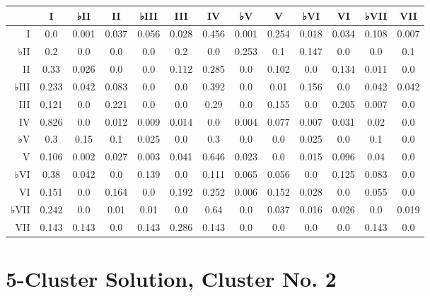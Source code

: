 \begin{table}[htbp]
\begin{minipage}{\linewidth}
\setlength{\tymax}{0.5\linewidth}
\centering
\small
\begin{tabulary}{\textwidth}{@{}RCCCCCCCCCCCC@{}} \toprule
&I&♭II&II&♭III&III&IV&♭V&V&♭VI&VI&♭VII&VII\\
\midrule
I&0.0&0.001&0.037&0.056&0.028&0.456&0.001&0.254&0.018&0.034&0.108&0.007\\
♭II&0.2&0.0&0.0&0.0&0.2&0.0&0.253&0.1&0.147&0.0&0.0&0.1\\
II&0.33&0.026&0.0&0.0&0.112&0.285&0.0&0.102&0.0&0.134&0.011&0.0\\
♭III&0.233&0.042&0.083&0.0&0.0&0.392&0.0&0.01&0.156&0.0&0.042&0.042\\
III&0.121&0.0&0.221&0.0&0.0&0.29&0.0&0.155&0.0&0.205&0.007&0.0\\
IV&0.826&0.0&0.012&0.009&0.014&0.0&0.004&0.077&0.007&0.031&0.02&0.0\\
♭V&0.3&0.15&0.1&0.025&0.0&0.3&0.0&0.0&0.025&0.0&0.1&0.0\\
V&0.106&0.002&0.027&0.003&0.041&0.646&0.023&0.0&0.015&0.096&0.04&0.0\\
♭VI&0.38&0.042&0.0&0.139&0.0&0.111&0.065&0.056&0.0&0.125&0.083&0.0\\
VI&0.151&0.0&0.164&0.0&0.192&0.252&0.006&0.152&0.028&0.0&0.055&0.0\\
♭VII&0.242&0.0&0.01&0.01&0.0&0.64&0.0&0.037&0.016&0.026&0.0&0.019\\
VII&0.143&0.143&0.0&0.143&0.286&0.143&0.0&0.0&0.0&0.0&0.143&0.0\\

\bottomrule

\end{tabulary}
\end{minipage}
\end{table}

\section{5-Cluster Solution, Cluster No. 2}
\label{5-clustersolutionclusterno.2}

